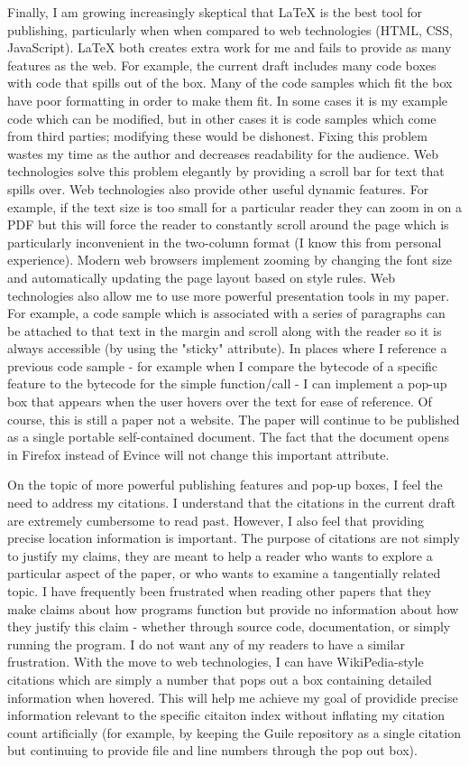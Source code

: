 Finally, I am growing increasingly skeptical that LaTeX is the best tool for publishing,
particularly when when compared to web technologies (HTML, CSS, JavaScript).
LaTeX both creates extra work for me and fails to provide as many features as the web.
For example, the current draft includes many code boxes with code that spills out of the
box.
Many of the code samples which fit the box have poor formatting in order to make them
fit.
In some cases it is my example code which can be modified, but in other cases it is code
samples which come from third parties; modifying these would be dishonest.
Fixing this problem wastes my time as the author and decreases readability for the
audience.
Web technologies solve this problem elegantly by providing a scroll bar for text that
spills over.
Web technologies also provide other useful dynamic features.
For example, if the text size is too small for a particular reader they can zoom in on a
PDF but this will force the reader to constantly scroll around the page which is
particularly inconvenient in the two-column format (I know this from personal experience).
Modern web browsers implement zooming by changing the font size and automatically updating
the page layout based on style rules.
Web technologies also allow me to use more powerful presentation tools in my paper.
For example, a code sample which is associated with a series of paragraphs can be attached
to that text in the margin and scroll along with the reader so it is always accessible (by
using the "sticky" attribute).
In places where I reference a previous code sample - for example when I compare the
bytecode of a specific feature to the bytecode for the simple function/call - I can
implement a pop-up box that appears when the user hovers over the text for ease of
reference.
Of course, this is still a paper not a website.
The paper will continue to be published as a single portable self-contained document.
The fact that the document opens in Firefox instead of Evince will not change this
important attribute.

On the topic of more powerful publishing features and pop-up boxes, I feel the need to
address my citations.
I understand that the citations in the current draft are extremely cumbersome to read
past.
However, I also feel that providing precise location information is important.
The purpose of citations are not simply to justify my claims, they are meant to help a
reader who wants to explore a particular aspect of the paper, or who wants to examine a
tangentially related topic.
I have frequently been frustrated when reading other papers that they make claims about
how programs function but provide no information about how they justify this claim -
whether through source code, documentation, or simply running the program.
I do not want any of my readers to have a similar frustration.
With the move to web technologies, I can have WikiPedia-style citations which are simply
a number that pops out a box containing detailed information when hovered.
This will help me achieve my goal of providide precise information relevant to the
specific citaiton index without inflating my citation count artificially (for example, by
keeping the Guile repository as a single citation but continuing to provide file and line
numbers through the pop out box).

